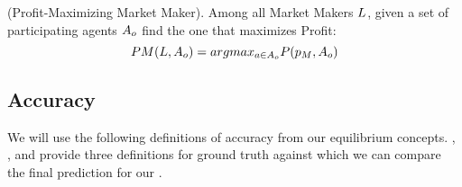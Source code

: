 \begin{definition} (Profit-Maximizing Market Maker).
\label{def:pmmm}
Among all Market Makers $L$, given a set of participating agents $A_o$ find the one that maximizes Profit:
$$ PM(L, A_o) = arg max_{a \in A_o} P(p_M, A_o)$$
\end{definition}

\subsection{Accuracy}
We will use the following definitions of accuracy from our equilibrium concepts.
, , and  provide three definitions for ground truth against which we can compare the final prediction for our . \\
